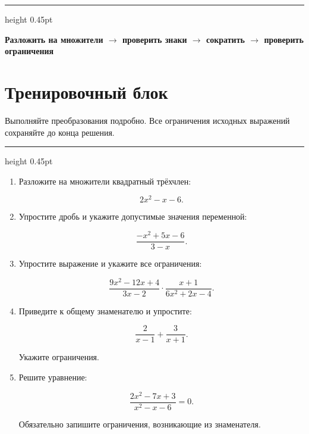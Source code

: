 \documentclass[a4paper,12pt]{article}
\newcommand{\separator}{%
  \vspace{0.4em}
  {\color{accent}\hrule height 0.45pt}
  \vspace{0.7em}
}
\begin{document}
\separator

\begin{center}
\large\bfseries\color{darkaccent}
Разложить на множители
\(\longrightarrow\)
проверить знаки
\(\longrightarrow\)
сократить
\(\longrightarrow\)
проверить ограничения
\end{center}


\clearpage

\section*{Тренировочный блок}

\textcolor{mutedgray}{
Выполняйте преобразования подробно.
Все ограничения исходных выражений сохраняйте до конца решения.
}

\separator

\begin{enumerate}[label=\textbf{\arabic*.}]

\item
Разложите на множители квадратный трёхчлен:

\[
2x^2-x-6.
\]

\vspace{12mm}

\item
Упростите дробь и укажите допустимые значения переменной:

\[
\frac{-x^2+5x-6}{3-x}.
\]

\vspace{15mm}

\item
Упростите выражение и укажите все ограничения:

\[
\frac{9x^2-12x+4}{3x-2}
\cdot
\frac{x+1}{6x^2+2x-4}.
\]

\vspace{18mm}

\item
Приведите к общему знаменателю и упростите:

\[
\frac{2}{x-1}
+
\frac{3}{x+1}.
\]

Укажите ограничения.

\vspace{18mm}

\item
Решите уравнение:

\[
\frac{2x^2-7x+3}{x^2-x-6}=0.
\]

Обязательно запишите ограничения, возникающие из знаменателя.

\end{enumerate}
\end{document}
